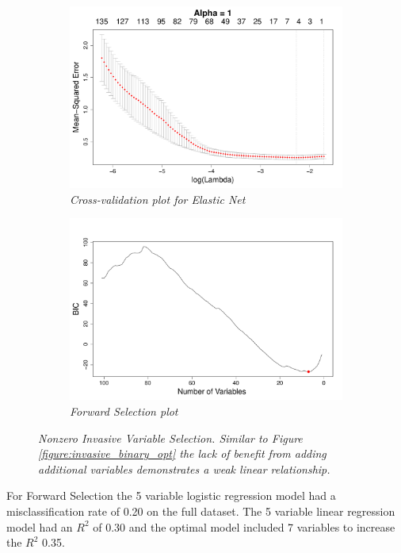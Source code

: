 \documentclass{article}
\begin{document}
\begin{figure}[h!]
\begin{subfigure}[b]{0.5\textwidth}
\includegraphics[width=\textwidth]{elastic_cv_invasive_nonzero.pdf}
\caption{\textsl{\small Cross-validation plot for Elastic Net}}
\end{subfigure}
\hfill
\begin{subfigure}[b]{0.5\textwidth}
\includegraphics[width=\textwidth]{forward_nvars_invasive_nonzero.pdf}
\caption{\textsl{\small Forward Selection plot}}
\end{subfigure}
\caption{\textsl{\small Nonzero Invasive Variable Selection. Similar to Figure \ref{figure:invasive_binary_opt} the lack of benefit from adding additional variables demonstrates a weak linear relationship.}}
\label{figure:invasive_nonzero_opt}
\end{figure}

For Forward Selection the 5 variable logistic regression model had a misclassification rate of 0.20 on the full dataset. The 5 variable linear regression model had an $R^2$ of 0.30 and the optimal model included 7 variables to increase the $R^2$ 0.35.
\end{document}
